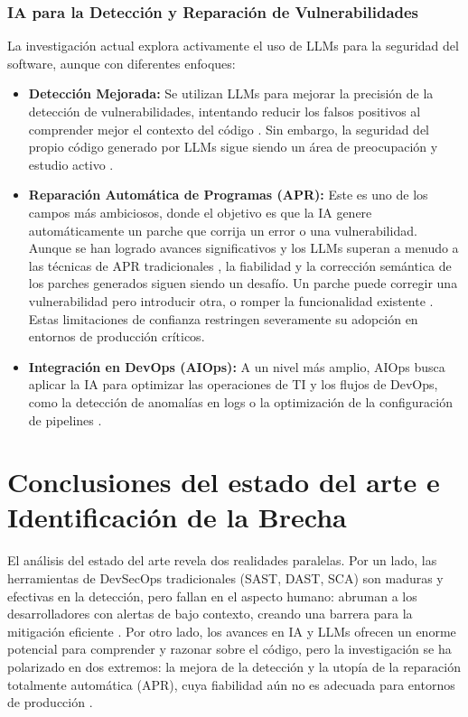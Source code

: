 \subsubsection{IA para la Detección y Reparación de Vulnerabilidades}

La investigación actual explora activamente el uso de LLMs para la seguridad del software, aunque con diferentes enfoques:

\begin{itemize}
    \item \textbf{Detección Mejorada:} Se utilizan LLMs para mejorar la precisión de la detección de vulnerabilidades, intentando reducir los falsos positivos al comprender mejor el contexto del código \cite{GitHubAICodeReviews}. Sin embargo, la seguridad del propio código generado por LLMs sigue siendo un área de preocupación y estudio activo \cite{GitGuardian2025CopilotConcerns}.
    \item \textbf{Reparación Automática de Programas (APR):} Este es uno de los campos más ambiciosos, donde el objetivo es que la IA genere automáticamente un parche que corrija un error o una vulnerabilidad. Aunque se han logrado avances significativos y los LLMs superan a menudo a las técnicas de APR tradicionales \cite{Liu2024APRSurvey}, la fiabilidad y la corrección semántica de los parches generados siguen siendo un desafío. Un parche puede corregir una vulnerabilidad pero introducir otra, o romper la funcionalidad existente \cite{Fu2023Patching}. Estas limitaciones de confianza restringen severamente su adopción en entornos de producción críticos.
    \item \textbf{Integración en DevOps (AIOps):} A un nivel más amplio, AIOps busca aplicar la IA para optimizar las operaciones de TI y los flujos de DevOps, como la detección de anomalías en logs o la optimización de la configuración de pipelines \cite{Iglesia2021AIOps}.
\end{itemize}

\section{Conclusiones del estado del arte e Identificación de la Brecha}\label{sec:conclusionesSOTA}

El análisis del estado del arte revela dos realidades paralelas. Por un lado, las herramientas de DevSecOps tradicionales (SAST, DAST, SCA) son maduras y efectivas en la detección, pero fallan en el aspecto humano: abruman a los desarrolladores con alertas de bajo contexto, creando una barrera para la mitigación eficiente \cite{Johnson2023UsabilitySAST}. Por otro lado, los avances en IA y LLMs ofrecen un enorme potencial para comprender y razonar sobre el código, pero la investigación se ha polarizado en dos extremos: la mejora de la detección y la utopía de la reparación totalmente automática (APR), cuya fiabilidad aún no es adecuada para entornos de producción \cite{Liu2024APRSurvey}.

